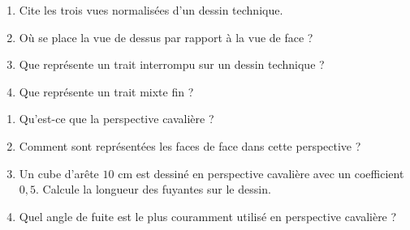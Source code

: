 \begin{enumerate}[label=\arabic*)]
\item Cite les trois vues normalisées d'un dessin technique.
\item Où se place la vue de dessus par rapport à la vue de face ?
\item Que représente un trait interrompu sur un dessin technique ?
\item Que représente un trait mixte fin ?
\end{enumerate}

\begin{enumerate}[label=\arabic*)]
\item Qu'est-ce que la perspective cavalière ?
\item Comment sont représentées les faces de face dans cette perspective ?
\item Un cube d'arête $10$ cm est dessiné en perspective cavalière avec un coefficient
$0{,}5$. Calcule la longueur des fuyantes sur le dessin.
\item Quel angle de fuite est le plus couramment utilisé en perspective cavalière ?
\end{enumerate}

